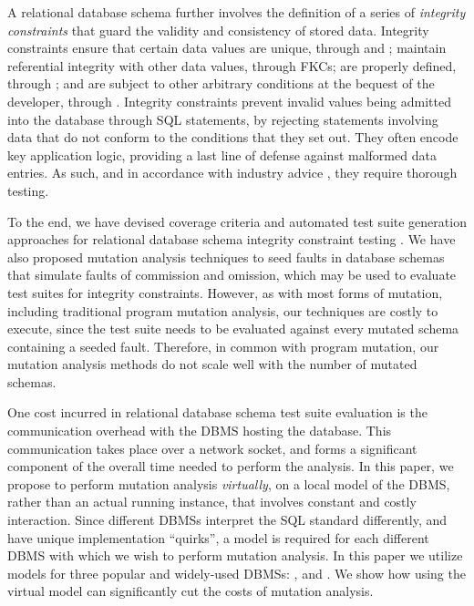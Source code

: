 %
 
\begin{sloppypar}
A relational database schema further involves the definition of a series of {\it integrity constraints} that guard the validity and consistency of stored data. Integrity constraints ensure that certain data values are unique, through \PKCs and \UCs; maintain referential integrity with other data values, through FKCs; are properly defined, through \NNCs; and are subject to other arbitrary conditions at the bequest of the developer, through \CCs. Integrity constraints prevent invalid values being admitted into the database through SQL \INSERT statements, by rejecting statements involving data that do not conform to the conditions that they set out. They often encode key application logic, providing a last line of defense against malformed data entries. As such, and in accordance with industry advice \cite{DzoneDatabaseTesting}, they require thorough testing. 
\end{sloppypar}

To the end, we have devised coverage criteria and automated test suite generation approaches for relational database schema integrity constraint testing \cite{Kapfhammer2013,McMinn2015}. We have also proposed mutation analysis techniques to seed faults in database schemas that simulate faults of commission and omission, which may be used to evaluate test suites for integrity constraints. 
%
However, as with most forms of mutation, including traditional program mutation analysis, our techniques are costly to execute, since the test suite needs to be evaluated against every mutated schema containing a seeded fault. Therefore, in common with program mutation, our mutation analysis methods do not scale well with the number of mutated schemas. 

One cost incurred in relational database schema test suite evaluation is the communication overhead with the DBMS hosting the database. This communication takes place over a network socket, and forms a significant component of the overall time needed to perform the analysis. In this paper, we propose to perform mutation analysis {\it virtually}, on a local model of the DBMS, rather than an actual running instance, that involves constant and costly interaction. Since different DBMSs interpret the SQL standard differently, and have unique implementation ``quirks'', a model is required for each different DBMS with which we wish to perform mutation analysis. In this paper we utilize models for three popular and widely-used DBMSs: \HyperSQL, \Postgres and \SQLite. %
We show how using the virtual model can significantly cut the costs of mutation analysis. %

